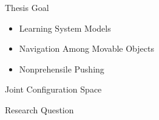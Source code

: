 
\begin{frame}[fragile]{Thesis Goal} %
\begin{itemize}
  \item Learning System Models\\%
  \item Navigation Among Movable Objects\\
  \item Nonprehensile Pushing
\end{itemize}
\end{frame}

\begin{frame}[fragile]{Joint Configuration Space}

\end{frame}


\begin{frame}[fragile]{Research Question}

\end{frame}


